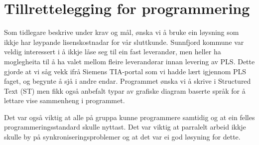 \chapter{Tillrettelegging for programmering}
\thispagestyle{fancy}

Som tidlegare beskrive under krav og mål, ønska vi å bruke ein løysning som ikkje har løypande lisenskostnadar for vår sluttkunde. 
Sunnfjord kommune var veldig interessert i å ikkje låse seg til ein fast leverandør, men heller ha moglegheita til å ha valet mellom fleire 
leverandørar innan levering av PLS. Dette gjorde at vi såg vekk ifrå Siemens TIA-portal som vi hadde lært
igjennom PLS faget, og begynte å sjå i andre endar.
Programmet ønska vi å skrive i Structured Text (ST) men fikk også anbefalt typar av grafiske diagram baserte språk for å lettare
vise sammenheng i programmet.

Det var også viktig at alle på gruppa kunne programmere samtidig og at ein felles programmeringsstandard skulle nyttast.
Det var viktig at parralelt arbeid ikkje skulle by på synkroniseringsproblemer og at det var ei god løsyning for dette.
